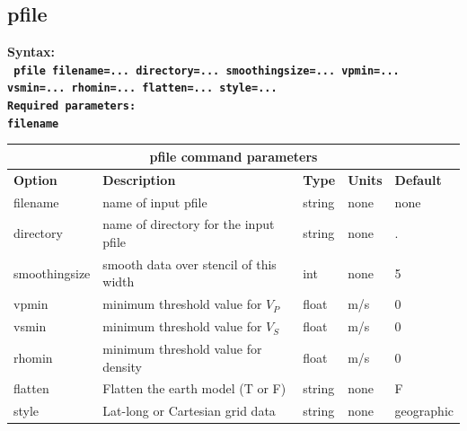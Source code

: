 \documentclass[11pt]{report}
\begin{document}
\subsection{pfile}
\label{keyword:pfile}
\begin{flushleft}\bf
Syntax:\\
\tt
pfile filename=... directory=... smoothingsize=... vpmin=... vsmin=... rhomin=... flatten=... style=... \\
\bf Required parameters:\\
\tt filename
\end{flushleft}
%
\begin{center}
\begin{tabular}{|l|p{8cm}|l|l||l|} \hline
\multicolumn{5}{|c|}{\bf pfile command parameters}\\ \hline
{\bf Option} & {\bf Description}                        & {\bf Type} & {\bf Units} & {\bf Default} \\ \hline 
\hline
filename      & name of input pfile                     & string  & none & none \\ \hline
directory     & name of directory for the input pfile   & string  & none & . \\ \hline
smoothingsize & smooth data over stencil of this width  & int     & none & 5 \\ \hline
vpmin         & minimum threshold value for $V_P$       & float   & m/s  & 0  \\ \hline
vsmin         & minimum threshold value for $V_S$       & float   & m/s  & 0  \\ \hline
rhomin        & minimum threshold value for density     & float   & m/s  & 0  \\ \hline
flatten       & Flatten the earth model (T or F)        & string  & none & F  \\ \hline
style         & Lat-long or Cartesian grid data         & string  & none & geographic \\ \hline
\end{tabular}
\end{center}

\end{document}
